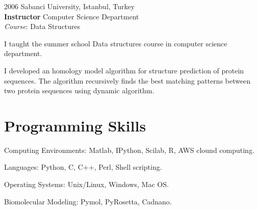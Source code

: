 \documentclass[12pt,letterpaper]{report}
\newcommand{\listitemspace}{0.25em}
\renewenvironment{itemize}
{\begin{list}{}{\setlength{\leftmargin}{0em}
                \setlength{\parskip}{0em}
                \setlength{\itemsep}{\listitemspace}
                \setlength{\parsep}{\listitemspace}}}
{\end{list}}
\begin{document}
\begin{tablist}
        \item[2006]\tab{}Sabanci University, Istanbul, Turkey \\
                             \textbf{Instructor} Computer Science Department\\
                             \textit{Course}: Data Structures
                             \begin{itemize}
                                \item \textbullet \hspace{0.2cm} I taught the summer school Data structures course in computer science department.
                                \item \textbullet \hspace{0.2cm} I developed an homology model algorithm for structure prediction of protein sequences. The algorithm recursively finds the best matching patterns between two protein sequences using dynamic algorithm.  
                            \end{itemize}

    \end{tablist}



    \section*{Programming Skills}
    \begin{itemize}
        \item \textbullet \hspace{0.2cm} Computing Environments: Matlab, IPython, Scilab, R, AWS clound computing.
        \item \textbullet \hspace{0.2cm} Languages: Python, C, C++, Perl, Shell scripting.
        \item \textbullet \hspace{0.2cm} Operating Systems: Unix/Linux, Windows, Mac OS.
        \item \textbullet \hspace{0.2cm} Biomolecular Modeling: Pymol, PyRosetta, Cadnano.
    \end{itemize}
\end{document}
